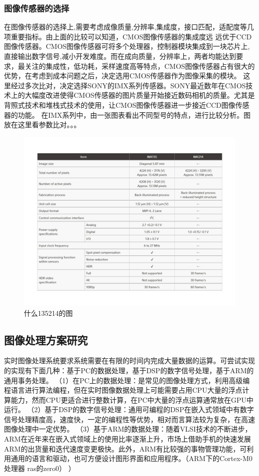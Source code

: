 \subsubsection{图像传感器的选择}
在图像传感器的选择上,需要考虑成像质量,分辨率,集成度，接口匹配，适配度等几项重要指标。由上面的比较可以知道，CMOS图像传感器的集成度远
远优于CCD图像传感器。CMOS图像传感器可将多个处理器，控制器模块集成到一块芯片上,
直接输出数字信号,减小开发难度。而在成向质量，分辨率上，两者均能达到要求，最关注的集成性，低功耗，采样速度高等特点，CMOS图像传感器占有很大的优势，在考虑到成本问题之后，决定选用CMOS传感器作为图像采集的模块。
这里经过多次比对，决定选择SONY的IMX系列传感器。SONY最近数年在CMOS技术上的大幅度改进使得CMOS传感器的图片质量开始接近数码相机的质量。尤其是背照式技术和堆栈式技术的使用，让CMOS图像传感器进一步接近CCD图像传感器的功能。
在IMX系列中，由一张图表看出不同型号的特点，进行比较分析。图放在这里看参数比对。。。
\begin{figure}[h]
\centering
\includegraphics[width=0.7\linewidth]{Figure/IMXCMOSp}
\caption{什么135214的图}
\label{fig:IMXCMOSp}
\end{figure}


\subsection{图像处理方案研究}
实时图像处理系统要求系统需要在有限的时间内完成大量数据的运算。可尝试实现的实现有下面几种：基于PC的数据处理，基于DSP的数字信号处理，基于ARM的通用事务处理。
（1）在PC上的数据处理：是常见的图像处理方式，利用高级编程语言进行算法编程，但在实时图像数据处理上可能需要占用CPU大量的浮点计算能力，然而CPU更适合进行整数计算，在PC中大量的浮点运算通常放在GPU中运行。
（2）基于DSP的数字信号处理：通用可编程的DSP在嵌入式领域中有数字信号处理精度高，速度快，一定的编程性等优势，相对而言算法较为复杂，在高速图像处理中一定优势。
（3）基于ARM的数据处理：随着VLSI技术的不断进步，ARM在近年来在嵌入式领域上的使用比率逐渐上升，市场上借助手机的快速发展ARM的出货量和迭代速度变更极快。此外，ARM有比较强的事物管理功能，可利用通用的语言和驱动，也可方便设计图形界面和应用程序。（ARM下的Cortex-M0 处理器 ras的zero0）
）

